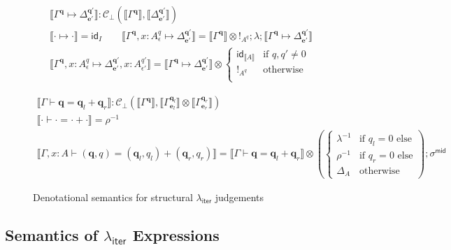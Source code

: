 \documentclass[acmsmall,screen,review]{acmart}
\newcommand{\mc}[1]{\ensuremath{\mathcal{#1}}}
\newcommand{\mb}[1]{\ensuremath{\mathbf{#1}}}
\newcommand{\ms}[1]{\ensuremath{\mathsf{#1}}}
\newcommand{\qsp}[4]{#1 \vdash #2 = #3 + #4}
\newcommand{\cwk}[2]{#1 \mapsto #2}
\newcommand{\dnt}[1]{\llbracket{#1}\rrbracket}
\newcommand{\subiterexp}{\texorpdfstring{\(\lambda_{\ms{iter}}\)}{lambda-iter}}
\begin{document}
\begin{figure}
  \begin{gather*}
    \boxed{\dnt{\cwk{\Gamma^{\mb{q}}}{\Delta^{\mb{q}'}_{\mb{e}'}}} 
      : \mc{C}_\bot(\dnt{\Gamma^{\mb{q}}}, \dnt{\Delta^{\mb{q}'}_{\mb{e}'}})} \\
    \dnt{\cwk{\cdot}{\cdot}} = \ms{id}_I \qquad
    \dnt{\cwk{\Gamma^{\mb{q}}, x : A^q_\epsilon}{\Delta^{\mb{q}'}_{\mb{e}'}}}
      = \dnt{\Gamma^{\mb{q}}} \otimes !_{A^q}
      ; \lambda
      ; \dnt{\cwk{\Gamma^{\mb{q}}}{\Delta^{\mb{q}'}_{\mb{e}'}}} \\
    \dnt{\cwk{\Gamma^{\mb{q}}, x : A^q_\epsilon}
              {\Delta^{\mb{q}'}_{\mb{e}'}, x : A^{q'}_{\epsilon'}}}
      = \dnt{\cwk{\Gamma^{\mb{q}}}{\Delta^{\mb{q}'}_{\mb{e}'}}} \otimes \begin{cases}
        \ms{id}_{\dnt{A}} & \text{if } q, q' \neq 0 \\
        !_{A^q} & \text{otherwise} \\
      \end{cases}
  \end{gather*}

  \begin{gather*}
    \boxed{\dnt{\qsp{\Gamma}{\mb{q}}{\mb{q}_l}{\mb{q}_r}} 
      : \mc{C}_\bot(\dnt{\Gamma^{\mb{q}}}, 
        \dnt{\Gamma^{\mb{q}_l}_{\mb{e}_l}} \otimes \dnt{\Gamma^{\mb{q}_r}_{\mb{e}_r}})} 
    \\
    \dnt{\qsp{\cdot}{\cdot}{\cdot}{\cdot}} = \rho^{-1}
    \\
    \dnt{\qsp{\Gamma, x : A}{(\mb{q}, q)}{(\mb{q}_l, q_l)}{(\mb{q}_r, q_r)}}
    = \dnt{\qsp{\Gamma}{\mb{q}}{\mb{q}_l}{\mb{q}_r}} \otimes
    \left(\begin{cases}
      \lambda^{-1} & \text{if } q_l = 0 \text{ else} \\
      \rho^{-1} & \text{if } q_r = 0 \text{ else} \\
      \Delta_A & \text{otherwise}
    \end{cases}\right) 
    ; \sigma^{\ms{mid}}
  \end{gather*}
  \caption{Denotational semantics for structural \subiterexp{} judgements}
  \Description{}
  \label{fig:struct-sem}
\end{figure}

\subsection{Semantics of \subiterexp{} Expressions}
\end{document}
